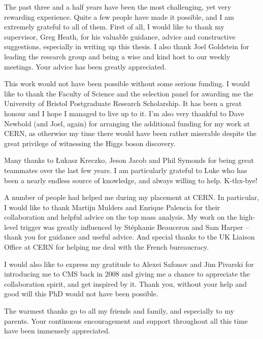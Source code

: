 


\begin{acknowledgements}
The past three and a half years have been the most challenging, yet very rewarding experience. Quite a few people have
made it possible, and I am extremely grateful to all of them. First of all, I would like to thank my supervisor, Greg
Heath, for his valuable guidance, advice and constructive suggestions, especially in writing up this thesis. I also
thank Joel Goldstein for leading the research group and being a wise and kind host to our weekly meetings. Your advice
has been greatly appreciated.

This work would not have been possible without some serious funding. I would like to thank the Faculty of Science and
the selection panel for awarding me the University of Bristol Postgraduate Research Scholarship. It has been a great
honour and I hope I managed to live up to it. I'm also very thankful to Dave Newbold (and Joel, again) for arranging the
additional funding for my work at CERN, as otherwise my time there would have been rather miserable despite the great
privilege of witnessing the Higgs boson discovery.

Many thanks to \L{}ukasz Kreczko, Jeson Jacob and Phil Symonds for being great teammates over the last few years. I am
particularly grateful to Luke who has been a nearly endless source of knowledge, and always willing to help. K-thx-bye!

A number of people had helped me during my placement at CERN. In particular, I would like to thank Martijn Mulders and
Enrique Palencia for their collaboration and helpful advice on the top mass analysis. My work on the high-level trigger
was greatly influenced by St\'{e}phanie Beauceron and Sam Harper -- thank you for guidance and useful advice. And special
thanks to the UK Liaison Office at CERN for helping me deal with the French bureaucracy.

I would also like to express my gratitude to Alexei Safonov and Jim Pivarski for introducing me to CMS back in 2008 and
giving me a chance to appreciate the collaboration spirit, and get inspired by it. Thank you, without your help and good
will this PhD would not have been possible.

The warmest thanks go to all my friends and family, and especially to my parents. Your continuous encouragement and
support throughout all this time have been immensely appreciated. %

\end{acknowledgements}


